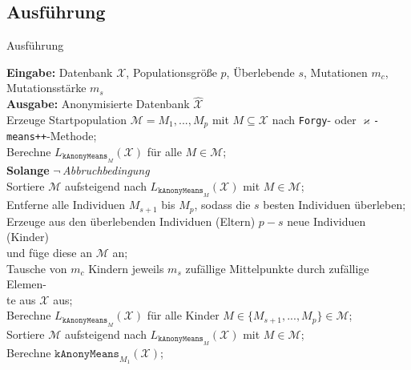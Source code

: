 \documentclass[10pt,table]{beamer}
\newcommand{\kmeansplusplus}{$\varkappa$\texttt{-means++}\xspace}
\newcommand{\kanonymeans}{\texttt{kAnonyMeans}\xspace}
\newcommand{\kanonymeansstar}{$\texttt{kAnonyMeans}^*$\xspace}
\newcommand{\forgy}{\texttt{Forgy}\xspace}
\begin{document}
\subsection{Ausführung}
\begin{frame}{Ausführung}
    \begin{algorithm}[H]
    \renewcommand{\thealgorithm}{}
    \caption{\kanonymeansstar}
    \label{alg:kanonymeansstar}
    {\footnotesize
    \textbf{Eingabe:} Datenbank $\mathcal{X}$, Populationsgröße $p$, Überlebende $s$, Mutationen $m_c$, Mutationsstärke $m_s$\\
    \textbf{Ausgabe:} Anonymisierte Datenbank $\hat{\mathcal{X}}$ \vspace*{0.1cm}\\
    Erzeuge Startpopulation $\mathcal{M} = M_1,...,M_p$ mit $M\subseteq \mathcal{X}$ nach \forgy- oder \kmeansplusplus-Methode;\\
    Berechne $L_{\kanonymeans_{M}}(\mathcal{X})$ für alle $M \in \mathcal{M}$;\\
    \textbf{Solange} $\lnot\,$\textit{Abbruchbedingung}\\
    \hspace*{1cm}Sortiere $\mathcal{M}$ aufsteigend nach $L_{\kanonymeans_{M}}(\mathcal{X})$ mit $M\in\mathcal{M}$;\\
    \hspace*{1cm}Entferne alle Individuen $M_{s+1}$ bis $M_p$, sodass die $s$ besten Individuen überleben;\\
    \hspace*{1cm}Erzeuge aus den überlebenden Individuen (Eltern) $p-s$ neue Individuen (Kinder) \\
    \hspace*{1.5cm}und füge diese an $\mathcal{M}$ an;\\
    \hspace*{1cm}Tausche von $m_c$ Kindern jeweils $m_s$ zufällige Mittelpunkte durch zufällige Elemen-\\
    \hspace*{1.5cm}te aus $\mathcal{X}$ aus;\\
    \hspace*{1cm}Berechne $L_{\kanonymeans_{M}}(\mathcal{X})$ für alle Kinder $M \in \{M_{s+1},...,M_p\} \in \mathcal{M}$;\\
    Sortiere $\mathcal{M}$ aufsteigend nach $L_{\kanonymeans_{M}}(\mathcal{X})$ mit $M\in\mathcal{M}$;\\
    Berechne $\kanonymeans_{M_{1}}(\mathcal{X})$;\vspace*{0.1cm}
    }
    \end{algorithm}  
\end{frame}
\end{document}
